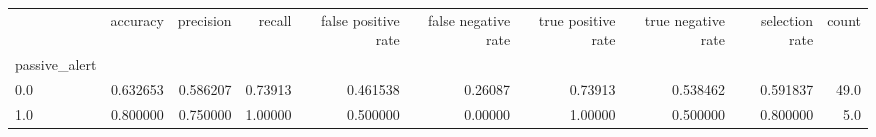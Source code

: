 \begin{tabular}{lrrrrrrrrr}
\toprule
{} &  accuracy &  precision &   recall &  false positive rate &  false negative rate &  true positive rate &  true negative rate &  selection rate &  count \\
passive\_alert &           &            &          &                      &                      &                     &                     &                 &        \\
\midrule
0.0           &  0.632653 &   0.586207 &  0.73913 &             0.461538 &              0.26087 &             0.73913 &            0.538462 &        0.591837 &   49.0 \\
1.0           &  0.800000 &   0.750000 &  1.00000 &             0.500000 &              0.00000 &             1.00000 &            0.500000 &        0.800000 &    5.0 \\
\bottomrule
\end{tabular}
